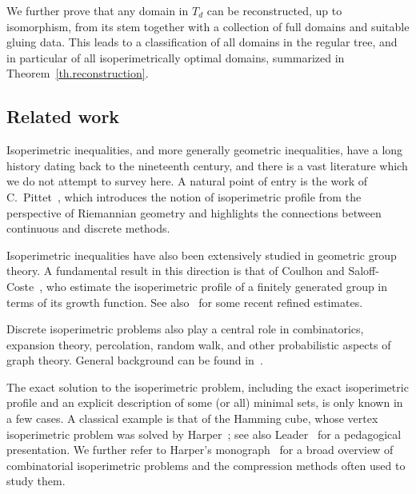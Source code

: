 \documentclass[a4paper, 11pt]{article}
\numberwithin{equation}{section}
\theoremstyle{definition}
\theoremstyle{remark}
\begin{document}
\smallskip

We further prove that any domain in $T_d$ can be reconstructed, up to isomorphism, from its stem together with a collection of full domains and suitable gluing data. This leads to a classification of all domains in the regular tree, and in particular of all isoperimetrically optimal domains, summarized in Theorem~\ref{th.reconstruction}.


\subsection{Related work}

Isoperimetric inequalities, and more generally geometric inequalities, have a long history dating back to the nineteenth century, and there is a vast literature which we do not attempt to survey here. A natural point of entry is the work of C.~Pittet~\cite{Pittet00}, which introduces the notion of isoperimetric profile from the perspective of Riemannian geometry and highlights the connections between continuous and discrete methods.

\smallskip 

Isoperimetric inequalities have also been extensively studied in geometric group theory. 
A fundamental result in this direction is that of Coulhon and Saloff-Coste~\cite{CoulhonSaloffCoste93}, who estimate the isoperimetric profile of a finitely generated group in terms of its growth function. 
See also~\cite{CT} for some recent refined estimates. 

Discrete isoperimetric problems also play a central role in combinatorics, expansion theory, percolation, random walk, and other probabilistic aspects of graph theory. General background can be found in~\cite{LyonsPeres2016, Woess2000}.

\smallskip 

The exact solution to the isoperimetric problem, including the exact isoperimetric profile and an explicit description of some (or all) minimal sets, is only known in a few cases. A classical example is that of the Hamming cube, whose vertex isoperimetric problem was solved by Harper~\cite{Harper64,Harper66}; see also Leader~\cite{Leader1991} for a pedagogical presentation. We further refer to Harper’s monograph~\cite{Harper2004} for a broad overview of combinatorial isoperimetric problems and the compression methods often used to study them.

\smallskip 
\end{document}
